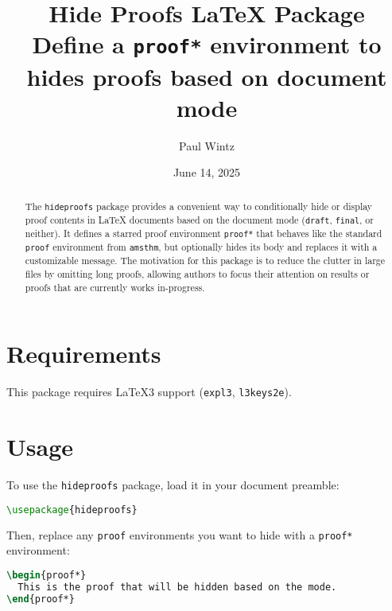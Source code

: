 \documentclass{article}
\title{Hide Proofs \LaTeX{} Package \\
\large Define a \texttt{proof*} environment to hides proofs based on document mode}
\author{Paul Wintz}
\date{June 14, 2025}
\begin{document}
\maketitle

\begin{abstract}
The \texttt{hideproofs} package provides a convenient way to conditionally hide or display proof contents in LaTeX documents based on the document mode (\texttt{draft}, \texttt{final}, or neither). It defines a starred proof environment \verb|proof*| that behaves like the standard \verb|proof| environment from \texttt{amsthm}, but optionally hides its body and replaces it with a customizable message.
The motivation for this package is to reduce the clutter in large files by omitting long proofs, allowing authors to focus their attention on results or proofs that are currently works in-progress.
\end{abstract}


\section{Requirements}
\label{sec:Requirements}
This package requires \LaTeX3 support (\texttt{expl3}, \texttt{l3keys2e}).

% 

\section{Usage}
\label{sec:Usage}
To use the \texttt{hideproofs} package, load it in your document preamble:
\begin{lstlisting}[language=TeX]
\usepackage{hideproofs}
\end{lstlisting}
Then, replace any \texttt{proof} environments you want to hide with a \texttt{proof*} environment:
\begin{lstlisting}[language=TeX]
\begin{proof*}
  This is the proof that will be hidden based on the mode.
\end{proof*}
\end{lstlisting}
\end{document}
